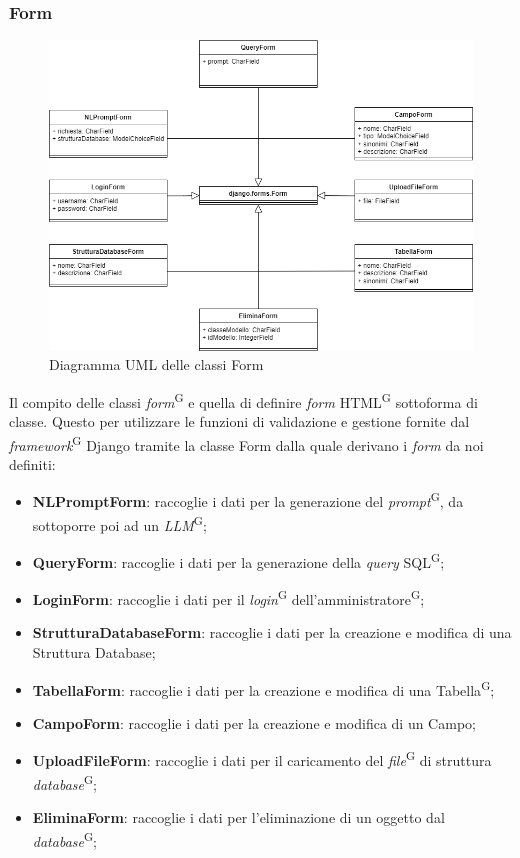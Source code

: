 \documentclass[5pt]{article}
\begin{document}
	\subsubsection{Form}
	\begin{figure}[H]
			\includegraphics[scale=0.65]{UML_classes/forms.png}
			\caption{Diagramma UML delle classi Form}
			\centering
	\end{figure}

	Il compito delle classi \textit{form}\textsuperscript{G} e quella di definire \textit{form} HTML\textsuperscript{G} sottoforma di classe. Questo per utilizzare le funzioni di validazione e gestione fornite dal \textit{framework}\textsuperscript{G} Django tramite la classe Form dalla quale derivano i \textit{form} da noi definiti:
	\begin{itemize}
		\item \textbf{NLPromptForm}: raccoglie i dati per la generazione del \textit{prompt}\textsuperscript{G}, da sottoporre poi ad un \textit{LLM}\textsuperscript{G};
		\item \textbf{QueryForm}: raccoglie i dati per la generazione della \textit{query} SQL\textsuperscript{G};
		\item \textbf{LoginForm}: raccoglie i dati per il \textit{login}\textsuperscript{G} dell'amministratore\textsuperscript{G};
		\item \textbf{StrutturaDatabaseForm}: raccoglie i dati per la creazione e modifica di una Struttura Database;
		\item \textbf{TabellaForm}: raccoglie i dati per la creazione e modifica di una Tabella\textsuperscript{G};
		\item \textbf{CampoForm}: raccoglie i dati per la creazione e modifica di un Campo;
		\item \textbf{UploadFileForm}: raccoglie i dati per il caricamento del \textit{file}\textsuperscript{G} di struttura \textit{database}\textsuperscript{G};
		\item \textbf{EliminaForm}: raccoglie i dati per l'eliminazione di un oggetto dal \textit{database}\textsuperscript{G};
	\end{itemize}
	
\end{document}
